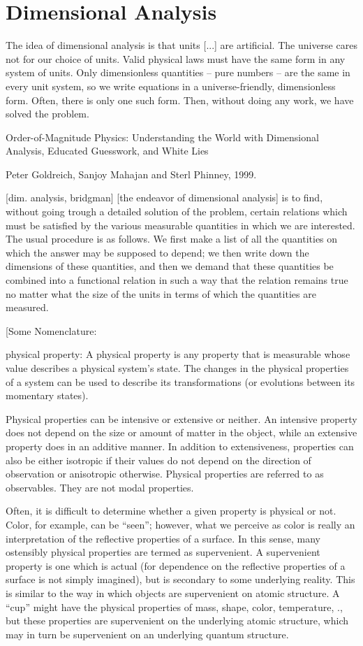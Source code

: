 \section{Dimensional Analysis}

\epigraph{The idea of dimensional analysis is that units [...] are artificial. The universe cares not for our choice of units. Valid physical laws must have the same form in any system of units. Only dimensionless quantities -- pure numbers -- are the same in every unit system, so we write equations in a universe-friendly, dimensionless form. Often, there is only one such form. Then, without doing any work, we have solved the problem.}
{Order-of-Magnitude Physics: Understanding the World with Dimensional Analysis, Educated Guesswork, and White Lies}
{Peter Goldreich, Sanjoy Mahajan and Sterl Phinney, 1999.}

[dim. analysis, bridgman]
[the endeavor of dimensional analysis] is to find, without going trough a detailed solution of the problem, certain relations which must be satisfied by the various measurable quantities in which we are interested. The usual procedure is as follows. We first make a list of all the quantities on which the answer may be supposed to depend; we then write down the dimensions of these quantities, and then we demand that these quantities be combined into a functional relation in such a way that the relation remains true no matter what the size of the units in terms of which the quantities are measured.


[Some Nomenclature:

physical property: A physical property is any property that is measurable whose value describes a physical system's state. The changes in the physical properties of a system can be used to describe its transformations (or evolutions between its momentary states).

Physical properties can be intensive or extensive or neither. An intensive property does not depend on the size or amount of matter in the object, while an extensive property does in an additive manner. In addition to extensiveness, properties can also be either isotropic if their values do not depend on the direction of observation or anisotropic otherwise. Physical properties are referred to as observables. They are not modal properties.

Often, it is difficult to determine whether a given property is physical or not. Color, for example, can be ``seen''; however, what we perceive as color is really an interpretation of the reflective properties of a surface. In this sense, many ostensibly physical properties are termed as supervenient. A supervenient property is one which is actual (for dependence on the reflective properties of a surface is not simply imagined), but is secondary to some underlying reality. This is similar to the way in which objects are supervenient on atomic structure. A ``cup'' might have the physical properties of mass, shape, color, temperature, \etc., but these properties are supervenient on the underlying atomic structure, which may in turn be supervenient on an underlying quantum structure.

